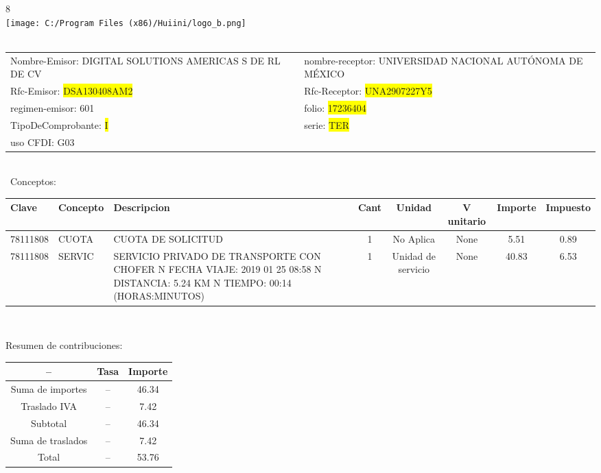 \documentclass{article}
\begin{document}
\hspace{18cm} 8\\
\texttt{[image: C:/Program Files (x86)/Huiini/logo\_b.png]}
\bigskip\\\
\begin{tabular}{p{11cm}p{1cm}p{8cm}}

Nombre-Emisor: DIGITAL SOLUTIONS AMERICAS S DE RL DE CV && nombre-receptor: UNIVERSIDAD NACIONAL AUTÓNOMA DE MÉXICO\\

Rfc-Emisor: \colorbox{yellow}{ DSA130408AM2 } & & Rfc-Receptor: \colorbox{yellow}{ UNA2907227Y5 }\\

regimen-emisor: 601 & & folio: \colorbox{yellow}{ 17236404 }\\

TipoDeComprobante: \colorbox{yellow}{ I } & & serie: \colorbox{yellow}{ TER }\\

uso CFDI: G03\\



\end{tabular}
\bigskip\bigskip\bigskip\\\
Conceptos:\\
\begin{tabular}{|p{1.5cm}|p{3.6cm}|p{3.6cm}|c|c|c|c|c|}
\hline
Clave & Concepto & Descripcion & Cant & Unidad & V unitario & Importe & Impuesto \\
\hline

78111808 & CUOTA  & CUOTA DE SOLICITUD & 1 & No Aplica & None & 5.51 &  0.89 \\
\hline

78111808 & SERVIC & SERVICIO PRIVADO DE TRANSPORTE CON CHOFER  N FECHA VIAJE: 2019 01 25 08:58  N DISTANCIA: 5.24 KM  N TIEMPO: 00:14 (HORAS:MINUTOS) & 1 & Unidad de servicio & None & 40.83 &  6.53 \\
\hline

\end{tabular}\\
\bigskip
\begin{center}
Resumen de contribuciones:\\
\bigskip
\begin{tabular}{|c|c|c|}
\hline
 -- & Tasa & Importe\\
\hline

Suma de importes & -- & 46.34 \\
\hline

Traslado IVA & -- & 7.42 \\
\hline

Subtotal  & -- & 46.34 \\
\hline

Suma de traslados & -- & 7.42 \\
\hline

Total  & -- & 53.76 \\
\hline

\end{tabular}
\end{center}
\end{document}
